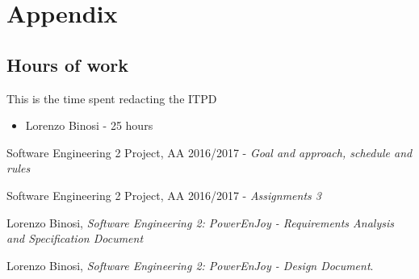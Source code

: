 \appendix \label{sec appendix}

\section{Appendix} 

\subsection{Hours of work}
This is the time spent redacting the ITPD
\begin{itemize}
	\item {Lorenzo Binosi} -  25 hours
\end{itemize}

\begin{thebibliography}{1}	
	Software Engineering 2 Project, AA 2016/2017 - \emph{Goal and approach, schedule and rules}
	
	Software Engineering 2 Project, AA 2016/2017 - \emph{Assignments 3}
	
	Lorenzo Binosi, \emph{Software Engineering 2: PowerEnJoy - Requirements Analysis and Specification Document}
	
	Lorenzo Binosi, \emph{Software Engineering 2: PowerEnJoy - Design Document}.
\end{thebibliography}